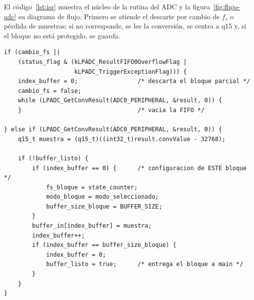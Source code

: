 \documentclass[11pt,a4paper]{article}
\begin{document}
El código~\ref{lst:isr} muestra el núcleo de la rutina del ADC y la
figura~\ref{fig:flujo-adc} su diagrama de flujo. Primero se atiende el
descarte por cambio de $f_s$ o pérdida de muestras; si no corresponde, se
lee la conversión, se centra a q15 y, si el bloque no está protegido, se
guarda.

\begin{lstlisting}[caption={Adquisición de un bloque en \texttt{ADC0\_IRQHANDLER()} (\texttt{source/TP3.c}).},label={lst:isr}]
if (cambio_fs ||
    (status_flag & (kLPADC_ResultFIFO0OverflowFlag |
                    kLPADC_TriggerExceptionFlag))) {
    index_buffer = 0;                 /* descarta el bloque parcial */
    cambio_fs = false;
    while (LPADC_GetConvResult(ADC0_PERIPHERAL, &result, 0)) {
    }                                 /* vacia la FIFO */

} else if (LPADC_GetConvResult(ADC0_PERIPHERAL, &result, 0)) {
    q15_t muestra = (q15_t)((int32_t)result.convValue - 32768);

    if (!buffer_listo) {
        if (index_buffer == 0) {      /* configuracion de ESTE bloque */
            fs_bloque = state_counter;
            modo_bloque = modo_seleccionado;
            buffer_size_bloque = BUFFER_SIZE;
        }
        buffer_in[index_buffer] = muestra;
        index_buffer++;
        if (index_buffer == buffer_size_bloque) {
            index_buffer = 0;
            buffer_listo = true;      /* entrega el bloque a main */
        }
    }
}
\end{lstlisting}
\end{document}
